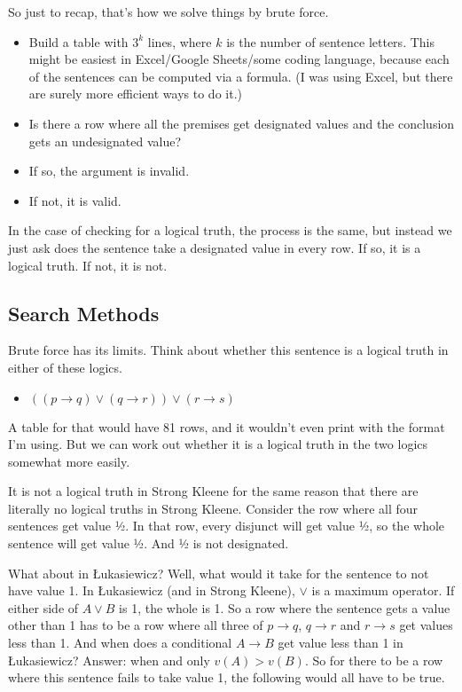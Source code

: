 \documentclass[
]{article}
\providecommand{\tightlist}{%
  \setlength{\itemsep}{0pt}\setlength{\parskip}{0pt}}\usepackage{longtable,booktabs,array}
\begin{document}
So just to recap, that's how we solve things by brute force.

\begin{itemize}
\tightlist
\item
  Build a table with \(3^k\) lines, where \(k\) is the number of
  sentence letters. This might be easiest in Excel/Google Sheets/some
  coding language, because each of the sentences can be computed via a
  formula. (I was using Excel, but there are surely more efficient ways
  to do it.)
\item
  Is there a row where all the premises get designated values and the
  conclusion gets an undesignated value?
\item
  If so, the argument is invalid.
\item
  If not, it is valid.
\end{itemize}

In the case of checking for a logical truth, the process is the same,
but instead we just ask does the sentence take a designated value in
every row. If so, it is a logical truth. If not, it is not.

\hypertarget{search-methods}{%
\subsection{Search Methods}\label{search-methods}}

Brute force has its limits. Think about whether this sentence is a
logical truth in either of these logics.

\begin{itemize}
\tightlist
\item
  \(((p \rightarrow q) \vee (q \rightarrow r)) \vee (r \rightarrow s)\)
\end{itemize}

A table for that would have 81 rows, and it wouldn't even print with the
format I'm using. But we can work out whether it is a logical truth in
the two logics somewhat more easily.

It is not a logical truth in Strong Kleene for the same reason that
there are literally no logical truths in Strong Kleene. Consider the row
where all four sentences get value ½. In that row, every disjunct will
get value ½, so the whole sentence will get value ½. And ½ is not
designated.

What about in Łukasiewicz? Well, what would it take for the sentence to
not have value 1. In Łukasiewicz (and in Strong Kleene), \(\vee\) is a
maximum operator. If either side of \(A \vee B\) is 1, the whole is 1.
So a row where the sentence gets a value other than 1 has to be a row
where all three of \(p \rightarrow q\), \(q \rightarrow r\) and
\(r \rightarrow s\) get values less than 1. And when does a conditional
\(A \rightarrow B\) get value less than 1 in Łukasiewicz? Answer: when
and only \(v(A) > v(B)\). So for there to be a row where this sentence
fails to take value 1, the following would all have to be true.
\end{document}
